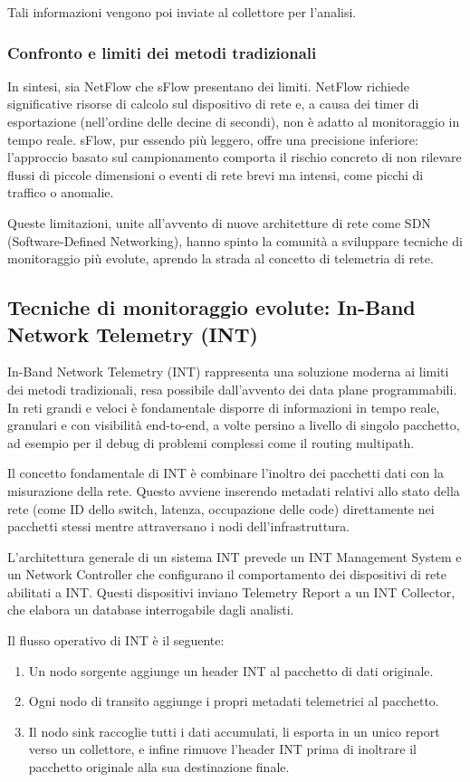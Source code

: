 Tali informazioni vengono poi inviate al collettore per l'analisi.

\subsubsection{Confronto e limiti dei metodi tradizionali}

In sintesi, sia NetFlow che sFlow presentano dei limiti.
NetFlow richiede significative risorse di calcolo sul dispositivo di rete e,
a causa dei timer di esportazione (nell'ordine delle decine di secondi),
non è adatto al monitoraggio in tempo reale.
sFlow, pur essendo più leggero, offre una precisione inferiore: l'approccio
basato sul campionamento comporta il rischio concreto di non rilevare flussi
di piccole dimensioni o eventi di rete brevi ma intensi, come picchi di
traffico o anomalie.

Queste limitazioni, unite all'avvento di nuove architetture di rete come SDN
(Software-Defined Networking), hanno spinto la comunità a sviluppare tecniche
di monitoraggio più evolute, aprendo la strada al concetto di telemetria di rete.

\subsection{Tecniche di monitoraggio evolute: In-Band Network Telemetry (INT)}

In-Band Network Telemetry (INT) rappresenta una soluzione moderna ai limiti
dei metodi tradizionali, resa possibile dall'avvento dei data plane programmabili.
In reti grandi e veloci è fondamentale disporre di informazioni in tempo reale,
granulari e con visibilità end-to-end, a volte persino a livello di singolo
pacchetto, ad esempio per il debug di problemi complessi come il routing multipath.


Il concetto fondamentale di INT è combinare l'inoltro dei pacchetti dati con
la misurazione della rete. Questo avviene inserendo metadati relativi allo
stato della rete (come ID dello switch, latenza, occupazione delle code)
direttamente nei pacchetti stessi mentre attraversano i nodi dell'infrastruttura.

L'architettura generale di un sistema INT prevede un INT Management System
e un Network Controller che configurano il comportamento dei dispositivi di
rete abilitati a INT. Questi dispositivi inviano Telemetry Report a un
INT Collector, che elabora un database interrogabile dagli analisti.

Il flusso operativo di INT è il seguente:
\begin{enumerate}
\item Un nodo sorgente aggiunge un header INT al pacchetto di dati originale.
\item Ogni nodo di transito aggiunge i propri metadati telemetrici al pacchetto.
\item Il nodo sink raccoglie tutti i dati accumulati, li esporta in un unico
report verso un collettore, e infine rimuove l'header INT prima di inoltrare
il pacchetto originale alla sua destinazione finale.
\end{enumerate}

